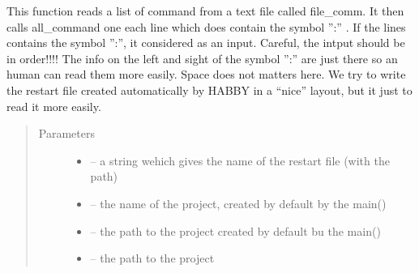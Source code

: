 \documentclass[letterpaper,10pt,english]{sphinxmanual}
\begin{document}

\begin{fulllineitems}
\label{\detokenize{index:src.func_for_cmd.habby_restart}}
This function reads a list of command from a text file called file\_comm. It then calls all\_command one each line
which does contain the symbol '':'' . If the lines contains the symbol '':'', it considered as an input.
Careful, the intput should be in order!!!! The info on the left and sight of the symbol '':'' are just there so
an human can read them more easily. Space does not matters here. We try to write the restart file created
automatically by HABBY in a ``nice'' layout, but it just to  read it more easily.
\begin{quote}\begin{description}
\item[{Parameters}] \leavevmode\begin{itemize}
\item {} 
 -- a string wehich gives the name of the restart file (with the path)

\item {} 
 -- the name of the project, created by default by the main()

\item {} 
 -- the path to the project created by default bu the main()

\item {} 
 -- the path to the project

\end{itemize}

\end{description}\end{quote}

\end{fulllineitems}

\end{document}
